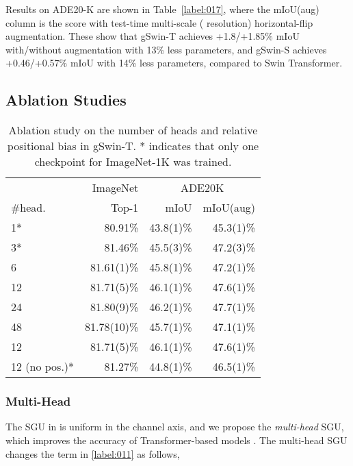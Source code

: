 \documentclass{article}
\begin{document}
Results on ADE20-K are shown in Table~\ref{label:017}, where the mIoU(aug) column is the score with test-time multi-scale ( resolution) horizontal-flip augmentation.
These show that gSwin-T achieves +1.8/+1.85\% mIoU with/without augmentation with 13\% less parameters, and gSwin-S achieves +0.46/+0.57\% mIoU with 14\% less parameters, compared to Swin Transformer.

\subsection{Ablation Studies}

\begin{table}[!t]
	\centering
	{
	\begin{tabular}{l|r|rr}
		\toprule
		         & ImageNet     & \multicolumn{2}{c}{ADE20K} \\
		\#head.  & Top-1        & mIoU      & mIoU(aug) \\ \midrule
		1*       & 80.91\%      & 43.8(1)\% & 45.3(1)\% \\
		3*       & 81.46\%      & 45.5(3)\% & 47.2(3)\% \\
		6        & 81.61(1)\%   & 45.8(1)\% & 47.2(1)\% \\
		12       & 81.71(5)\%   & 46.1(1)\% & 47.6(1)\% \\
		24       & 81.80(9)\%   & 46.2(1)\% & 47.7(1)\% \\
		48       & 81.78(10)\%  & 45.7(1)\% & 47.1(1)\% \\ \midrule
		12            & 81.71(5)\% & 46.1(1)\% & 47.6(1)\% \\
		12 (no pos.)* & 81.27\%    & 44.8(1)\% & 46.5(1)\% \\
		\bottomrule
	\end{tabular}
	}
	\caption{
		Ablation study on the number of heads and relative positional bias in gSwin-T. * indicates that only one checkpoint for ImageNet-1K was trained.
	}
	\label{label:018}
\end{table}

\subsubsection{Multi-Head}\label{label:019}

The SGU in \cite{liu2021pay} is uniform in the channel axis, and we propose the \textit{multi-head} SGU, which improves the accuracy of Transformer-based models \cite{vaswani2017attention}.
The multi-head SGU changes the term  in \eqref{label:011} as follows,
\end{document}
